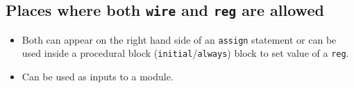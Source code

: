 \documentclass[a4paper,10pt]{article}
\theoremstyle{mytheor}
\begin{document}
 \subsection{Places where both \lstinline[style=verilog-inline-style]{wire} and \lstinline[style=verilog-inline-style]{reg} are allowed}

 \begin{itemize}
 \item Both can appear on the right hand side of an \lstinline[style=verilog-inline-style]{assign} statement or can be used inside a procedural block (\lstinline[style=verilog-inline-style]{initial}/\lstinline[style=verilog-inline-style]{always}) block to set value of a \lstinline[style=verilog-inline-style]{reg}.
 \item Can be used as inputs to a module.
\end{itemize}

\end{document}
